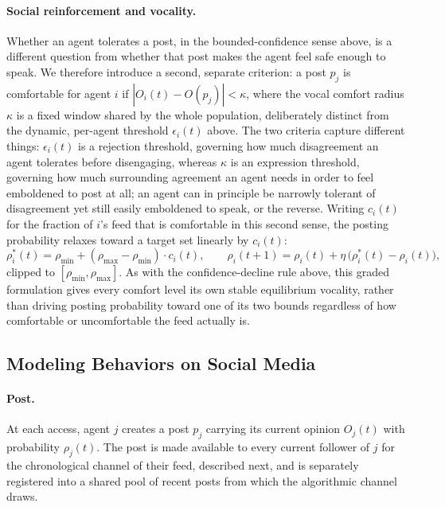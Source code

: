 \documentclass{svproc}
\begin{document}
\paragraph{Social reinforcement and vocality.} Whether an agent tolerates a post, in the bounded-confidence sense above, is a different question from whether that post makes the agent feel safe enough to speak. We therefore introduce a second, separate criterion: a post $p_j$ is comfortable for agent $i$ if $|O_i(t)-O(p_j)|<\kappa$, where the vocal comfort radius $\kappa$ is a fixed window shared by the whole population, deliberately distinct from the dynamic, per-agent threshold $\epsilon_i(t)$ above. The two criteria capture different things: $\epsilon_i(t)$ is a rejection threshold, governing how much disagreement an agent tolerates before disengaging, whereas $\kappa$ is an expression threshold, governing how much surrounding agreement an agent needs in order to feel emboldened to post at all; an agent can in principle be narrowly tolerant of disagreement yet still easily emboldened to speak, or the reverse. Writing $c_i(t)$ for the fraction of $i$'s feed that is comfortable in this second sense, the posting probability relaxes toward a target set linearly by $c_i(t)$:
\begin{equation}
\rho_i^{\ast}(t) = \rho_{\min} + (\rho_{\max}-\rho_{\min})\cdot c_i(t), \qquad
\rho_i(t{+}1) = \rho_i(t) + \eta\,\big(\rho_i^{\ast}(t)-\rho_i(t)\big),
\end{equation}
clipped to $[\rho_{\min},\rho_{\max}]$. As with the confidence-decline rule above, this graded formulation gives every comfort level its own stable equilibrium vocality, rather than driving posting probability toward one of its two bounds regardless of how comfortable or uncomfortable the feed actually is.

\subsection{Modeling Behaviors on Social Media}\label{sec:model-behaviors}

\paragraph{Post.} At each access, agent $j$ creates a post $p_j$ carrying its current opinion $O_j(t)$ with probability $\rho_j(t)$. The post is made available to every current follower of $j$ for the chronological channel of their feed, described next, and is separately registered into a shared pool of recent posts from which the algorithmic channel draws.
\end{document}
